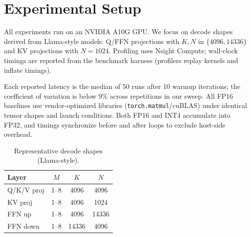 \section{Experimental Setup}
All experiments run on an NVIDIA A10G GPU. We focus on decode shapes derived
from Llama-style models: Q/FFN projections with $K,N$ in $\{4096, 14336\}$ and
KV projections with $N=1024$. Profiling uses Nsight Compute; wall-clock timings
are reported from the benchmark harness (profilers replay kernels and inflate
timings).

Each reported latency is the median of 50 runs after 10 warmup iterations; the
coefficient of variation is below 9\% across repetitions in our sweep. All
FP16 baselines use vendor-optimized libraries (\texttt{torch.matmul}/cuBLAS)
under identical tensor shapes and launch conditions. Both FP16 and INT4
accumulate into FP32, and timings synchronize before and after loops to exclude
host-side overhead.

\begin{table}[h]
  \centering
  \caption{Representative decode shapes (Llama-style).}
  \label{tab:shapes}
  \begin{tabular}{lccc}
    \toprule
    Layer & $M$ & $K$ & $N$ \\
    \midrule
    Q/K/V proj & 1--8 & 4096 & 4096 \\
    KV proj & 1--8 & 4096 & 1024 \\
    FFN up & 1--8 & 4096 & 14336 \\
    FFN down & 1--8 & 14336 & 4096 \\
    \bottomrule
  \end{tabular}
\end{table}
